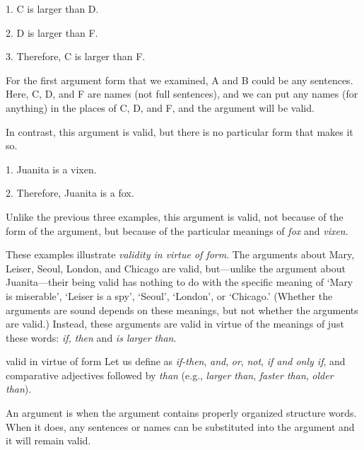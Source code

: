 	\noindent\begin{minipage}{0.99\textwidth}
	\begin{earg}
		\item[1.] C is larger than D.
		\item[2.] D is larger than F.
		\item[3.] Therefore, C is larger than F. 
	\end{earg}
	\end{minipage}

\noindent For the first argument form that we examined, A and B could be any sentences. Here, C, D, and F are names (not full sentences), and we can put any names (for anything) in the places of C, D, and F, and the argument will be valid.

In contrast, this argument is valid, but there is no particular form that makes it so.
	\begin{earg}
		\item[1.] Juanita is a vixen.
		\item[2.] Therefore, Juanita is a fox.
	\end{earg}
Unlike the previous three examples, this argument is valid, not because of the form of the argument, but because of the particular meanings of \textit{fox} and \textit{vixen}. 

These examples illustrate \emph{validity in virtue of form}. The arguments about Mary, Leiser, Seoul, London, and Chicago are valid, but---unlike the argument about Juanita---their being valid has nothing to do with the specific meaning of `Mary is miserable', `Leiser is a spy', `Seoul', `London', or `Chicago.' (Whether the arguments are sound depends on these meanings, but not whether the arguments are valid.) Instead, these arguments are valid in virtue of the meanings of just these words: \textit{if, then} and \textit{is larger than}.

\begin{factboxy}{valid in virtue of form}
Let us define  as \textit{if-then}, \textit{and}, \textit{or}, \textit{not}, \textit{if and only if}, and comparative adjectives followed by \textit{than} (e.g., \textit{larger than}, \textit{faster than}, \textit{older than}).

An argument is  when the argument contains properly organized structure words. When it does, any sentences or names can be substituted into the argument and it will remain valid. 
\end{factboxy}

